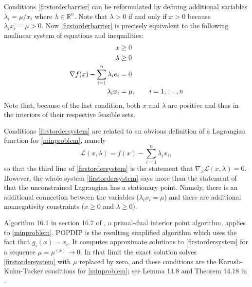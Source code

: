 \documentclass[11pt]{article}
\newcommand{\RR}{\mathbb{R}}
\newcommand{\grad}{\nabla}
\begin{document}
Conditions \eqref{firstorderbarrier} can be reformulated by defining additional variables $\lambda_i = \mu / x_i$ where $\lambda\in\RR^n$.  Note that $\lambda>0$ if and only if $x>0$ because $\lambda_i x_i = \mu > 0$.  Now \eqref{firstorderbarrier} is precisely equivalent to the following nonlinear system of equations and inequalities:
\begin{align}
x &\ge 0 \label{firstordersystem} \\
\lambda &\ge 0 \notag \\
\grad f(x) - \sum_{i=1}^n \lambda_i e_i &= 0 \notag \\
\lambda_i x_i &= \mu, \qquad i=1,\dots,n \notag
\end{align}
Note that, because of the last condition, both $x$ and $\lambda$ are positive and thus in the interiors of their respective feasible sets.

Conditions \eqref{firstordersystem} are related to an obvious definition of a Lagrangian function for \eqref{minproblem}, namely
    $$\mathcal{L}(x,\lambda) = f(x) - \sum_{i=1}^n \lambda_i x_i,$$
so that the third line of \eqref{firstordersystem} is the statement that $\grad_x \mathcal{L}(x,\lambda)=0$.  However, the whole system \eqref{firstordersystem} says more than the statement of that the unconstrained Lagrangian has a stationary point.  Namely, there is an additional connection between the variables ($\lambda_i x_i = \mu$) and there are additional nonnegativity constraints ($x\ge 0$ and $\lambda\ge 0$).

Algorithm 16.1 in section 16.7 of \cite{GrivaNashSofer2009}, a primal-dual interior point algorithm, applies to \eqref{minproblem}.  POPDIP is the resulting simplified algorithm which uses the fact that $g_i(x)=x_i$.  It computes approximate solutions to \eqref{firstordersystem} for a sequence $\mu=\mu^{(k)} \to 0$.  In that limit the exact solution solves \eqref{firstordersystem} with $\mu$ replaced by zero, and these conditions are the Karush-Kuhn-Tucker conditions for \eqref{minproblem}; see Lemma 14.8 and Theorem 14.18 in \cite{GrivaNashSofer2009}.
\end{document}
